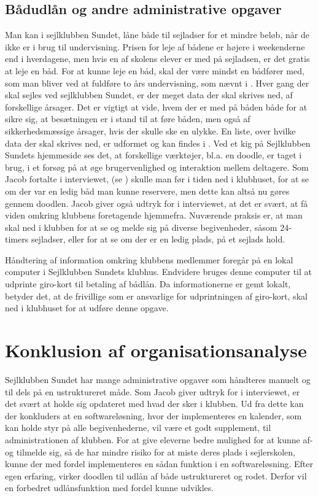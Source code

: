 \subsection{Bådudlån og andre administrative opgaver}\label{subsec:bådudlån}

Man kan i sejlklubben Sundet, låne både til sejladser for et mindre beløb, når de ikke er i brug til undervisning.
Prisen for leje af bådene er højere i weekenderne end i hverdagene, men hvis en af skolens elever er med på sejladsen, er
det gratis at leje en båd. For at kunne leje en båd, skal der være mindst en bådfører med, som man bliver ved at
fuldføre to års undervisning, som nævnt i  \citep{Sundet}. Hver gang der skal sejles ved
sejlklubben Sundet, er der meget data der skal skrives ned, af forskellige årsager. Det er vigtigt at vide, hvem der er
med på båden både for at sikre sig, at besætningen er i stand til at føre båden, men også af sikkerhedsmæssige årsager,
hvis der skulle ske en ulykke. En liste, over hvilke data der skal skrives ned, er udformet og kan findes i
. Ved et kig på Sejlklubben Sundets hjemmeside \citep{SundetUdlaan} ses det, at forskellige
værktøjer, bl.a. en doodle, er taget i brug, i et forsøg på at øge brugervenlighed og interaktion mellem deltagere. 
Som Jacob fortalte i interviewet, (se ) skulle man før i tiden ned i klubhuset, for at se om der var
en ledig båd man kunne reservere, men dette kan altså nu gøres gennem doodlen. Jacob giver også udtryk for i
interviewet, at det er svært, at få viden omkring klubbens foretagende hjemmefra. Nuværende praksis er, at man skal ned i
klubben for at se og melde sig på diverse begivenheder, såsom 24-timers sejladser, eller for at se om der er en ledig
plads, på et sejlads hold.

Håndtering af information omkring klubbens medlemmer foregår på en lokal computer i Sejlklubben Sundets klubhus. Endvidere bruges denne computer til at udprinte giro-kort til betaling af bådlån. Da informationerne er gemt lokalt,
betyder det, at de frivillige som er ansvarlige for udprintningen af giro-kort, skal ned i klubhuset for at udføre denne
opgave.


\section{Konklusion af organisationsanalyse}\label{sec:organisation-konklusion}

Sejlklubben Sundet har mange administrative opgaver som håndteres manuelt og til dels på en ustruktureret måde. Som
Jacob giver udtryk for i interviewet, er det svært at holde sig opdateret med hvad der sker i klubben. Ud fra dette kan
der konkluders at en softwareløsning, hvor der implementeres en kalender, som kan holde styr på alle begivenhederne, vil
være et godt supplement, til administrationen af klubben. For at give eleverne bedre mulighed for at kunne af- og
tilmelde sig, så de har mindre risiko for at miste deres plads i sejlerskolen, kunne der med fordel implementeres en
sådan funktion i en softwareløsning. Efter egen erfaring, virker doodlen til udlån af både ustruktureret og rodet.
Derfor vil en forbedret udlånsfunktion med fordel kunne udvikles.

